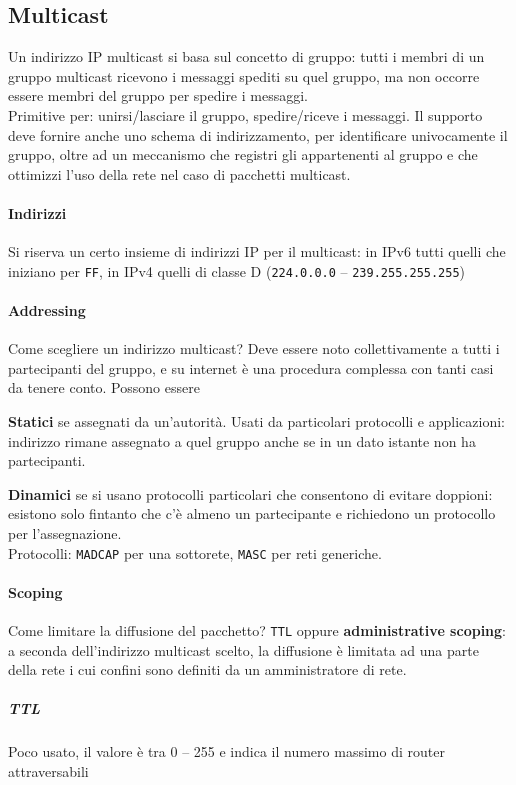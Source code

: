 \documentclass[10pt]{article}
\begin{document}
\subsection{Multicast}
Un indirizzo IP multicast si basa sul concetto di gruppo: tutti i membri di un gruppo multicast ricevono i messaggi spediti su quel gruppo, ma non occorre essere membri del gruppo per spedire i messaggi.\\
Primitive per: unirsi/lasciare il gruppo, spedire/riceve i messaggi. Il supporto deve fornire anche uno schema di indirizzamento, per identificare univocamente il gruppo, oltre ad un meccanismo che registri gli appartenenti al gruppo e che ottimizzi l'uso della rete nel caso di pacchetti multicast.
\paragraph{Indirizzi} Si riserva un certo insieme di indirizzi IP per il multicast: in IPv6 tutti quelli che iniziano per \texttt{FF}, in IPv4 quelli di classe D (\texttt{224.0.0.0} -- \texttt{239.255.255.255})
\paragraph{Addressing} Come scegliere un indirizzo multicast? Deve essere noto collettivamente a tutti i partecipanti del gruppo, e su internet è una procedura complessa con tanti casi da tenere conto. Possono essere
\begin{list}{}{}
	\item \textbf{Statici} se assegnati da un'autorità. Usati da particolari protocolli e applicazioni: indirizzo rimane assegnato a quel gruppo anche se in un dato istante non ha partecipanti.
	\item \textbf{Dinamici} se si usano protocolli particolari che consentono di evitare doppioni: esistono solo fintanto che c'è almeno un partecipante e richiedono un protocollo per l'assegnazione.\\
	Protocolli: \texttt{MADCAP} per una sottorete, \texttt{MASC} per reti generiche.
\end{list}
\paragraph{Scoping} Come limitare la diffusione del pacchetto? \texttt{TTL} oppure \textbf{administrative scoping}: a seconda dell'indirizzo multicast scelto, la diffusione è limitata ad una parte della rete i cui confini sono definiti da un amministratore di rete.
\subparagraph{TTL} Poco usato, il valore è tra 0 -- 255 e indica il numero massimo di router attraversabili
\end{document}
